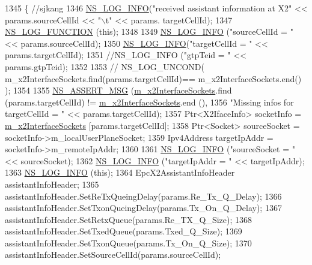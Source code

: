 \begin{DoxyCode}
1345                                                                                    \{ \textcolor{comment}{//sjkang}
1346 \hyperlink{group__logging_gafbd73ee2cf9f26b319f49086d8e860fb}{NS\_LOG\_INFO}(\textcolor{stringliteral}{"received assistant information at X2"} << params.sourceCellId << \textcolor{stringliteral}{"\(\backslash\)t"} << params.
      targetCellId);
1347 \hyperlink{log-macros-disabled_8h_a90b90d5bad1f39cb1b64923ea94c0761}{NS\_LOG\_FUNCTION} (\textcolor{keyword}{this});
1348 
1349  \hyperlink{group__logging_gafbd73ee2cf9f26b319f49086d8e860fb}{NS\_LOG\_INFO} (\textcolor{stringliteral}{"sourceCellId = "} << params.sourceCellId);
1350  \hyperlink{group__logging_gafbd73ee2cf9f26b319f49086d8e860fb}{NS\_LOG\_INFO}(\textcolor{stringliteral}{"targetCellId = "} << params.targetCellId);
1351  \textcolor{comment}{//NS\_LOG\_INFO ("gtpTeid = " << params.gtpTeid);}
1352 
1353 \textcolor{comment}{// NS\_LOG\_UNCOND( m\_x2InterfaceSockets.find(params.targetCellId)== m\_x2InterfaceSockets.end() );}
1354 
1355  \hyperlink{assert_8h_aff5ece9066c74e681e74999856f08539}{NS\_ASSERT\_MSG} (\hyperlink{classns3_1_1EpcX2_a0665276228b9b99a52ef6d5e9bdb306d}{m\_x2InterfaceSockets}.find (params.targetCellId) != 
      \hyperlink{classns3_1_1EpcX2_a0665276228b9b99a52ef6d5e9bdb306d}{m\_x2InterfaceSockets}.end (),
1356                 \textcolor{stringliteral}{"Missing infos for targetCellId = "} << params.targetCellId);
1357  Ptr<X2IfaceInfo> socketInfo = \hyperlink{classns3_1_1EpcX2_a0665276228b9b99a52ef6d5e9bdb306d}{m\_x2InterfaceSockets} [params.targetCellId];
1358  Ptr<Socket> sourceSocket = socketInfo->m\_localUserPlaneSocket;
1359  Ipv4Address targetIpAddr = socketInfo->m\_remoteIpAddr;
1360 
1361  \hyperlink{group__logging_gafbd73ee2cf9f26b319f49086d8e860fb}{NS\_LOG\_INFO} (\textcolor{stringliteral}{"sourceSocket = "} << sourceSocket);
1362  \hyperlink{group__logging_gafbd73ee2cf9f26b319f49086d8e860fb}{NS\_LOG\_INFO} (\textcolor{stringliteral}{"targetIpAddr = "} << targetIpAddr);
1363 \hyperlink{group__logging_gafbd73ee2cf9f26b319f49086d8e860fb}{NS\_LOG\_INFO} (\textcolor{keyword}{this});
1364  EpcX2AssistantInfoHeader assistantInfoHeader;
1365  assistantInfoHeader.SetReTxQueingDelay(params.Re\_Tx\_Q\_Delay);
1366  assistantInfoHeader.SetTxonQueingDelay(params.Tx\_On\_Q\_Delay);
1367  assistantInfoHeader.SetRetxQueue(params.Re\_TX\_Q\_Size);
1368  assistantInfoHeader.SetTxedQueue(params.Txed\_Q\_Size);
1369  assistantInfoHeader.SetTxonQueue(params.Tx\_On\_Q\_Size);
1370  assistantInfoHeader.SetSourceCellId(params.sourceCellId);

\end{DoxyCode}
